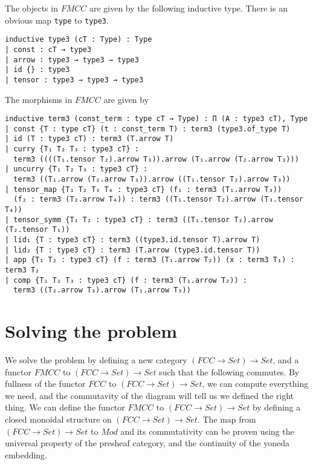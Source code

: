 \documentclass[12pt]{article} %
\theoremstyle{definition}
\theoremstyle{definition}
\theoremstyle{definition}
\theoremstyle{definition}
\begin{document}
The objects in $FMCC$ are given by the following inductive type. 
There is an obvious map \lstinline{type} to \lstinline {type3}.

\begin{lstlisting}
inductive type3 (cT : Type) : Type
| const : cT → type3
| arrow : type3 → type3 → type3
| id {} : type3
| tensor : type3 → type3 → type3
\end{lstlisting}

The morphisms in $FMCC$ are given by 

\begin{lstlisting}
inductive term3 (const_term : type cT → Type) : Π (A : type3 cT), Type
| const {T : type cT} (t : const_term T) : term3 (type3.of_type T)
| id (T : type3 cT) : term3 (T.arrow T)
| curry {T₁ T₂ T₃ : type3 cT} :
  term3 ((((T₁.tensor T₂).arrow T₃)).arrow (T₁.arrow (T₂.arrow T₃)))
| uncurry {T₁ T₂ T₃ : type3 cT} :
  term3 ((T₁.arrow (T₂.arrow T₃)).arrow ((T₁.tensor T₂).arrow T₃))
| tensor_map {T₁ T₂ T₃ T₄ : type3 cT} (f₁ : term3 (T₁.arrow T₃))
  (f₂ : term3 (T₂.arrow T₄)) : term3 ((T₁.tensor T₂).arrow (T₃.tensor T₄))
| tensor_symm {T₁ T₂ : type3 cT} : term3 ((T₁.tensor T₂).arrow (T₂.tensor T₁))
| lid₁ {T : type3 cT} : term3 ((type3.id.tensor T).arrow T)
| lid₂ {T : type3 cT} : term3 (T.arrow (type3.id.tensor T))
| app {T₁ T₂ : type3 cT} (f : term3 (T₁.arrow T₂)) (x : term3 T₁) : term3 T₂
| comp {T₁ T₂ T₃ : type3 cT} (f : term3 (T₁.arrow T₂)) :
  term3 ((T₂.arrow T₃).arrow (T₁.arrow T₃))
\end{lstlisting}

\section{Solving the problem}

We solve the problem by defining a new category $(FCC \rightarrow Set) \rightarrow Set$, 
and a functor $FMCC$ to $(FCC \rightarrow Set) \rightarrow Set$ such that the following 
commutes. By fullness of the functor $FCC$ to $(FCC \rightarrow Set) \rightarrow Set$, we can compute everything we need,
and the commutavity of the diagram will tell us we defined the right thing. 
We can define the functor $FMCC$ to $(FCC \rightarrow Set) \rightarrow Set$ by defining a closed monoidal structure on
$(FCC \rightarrow Set) \rightarrow Set$. The map from $(FCC \rightarrow Set) \rightarrow Set$ to $Mod$ and its commutativity can be proven
using the universal property of the presheaf category, and the continuity of the yoneda embedding.
\end{document}
